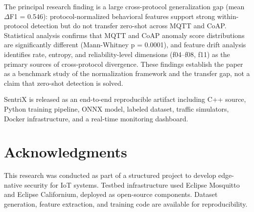 \documentclass[conference]{IEEEtran}
\begin{document}
The principal research finding is a large cross-protocol generalization gap (mean $\Delta$F1 = 0.546): protocol-normalized behavioral features support strong within-protocol detection but do not transfer zero-shot across MQTT and CoAP. Statistical analysis confirms that MQTT and CoAP anomaly score distributions are significantly different (Mann-Whitney p = 0.0001), and feature drift analysis identifies rate, entropy, and reliability-level dimensions (f04--f08, f11) as the primary sources of cross-protocol divergence. These findings establish the paper as a benchmark study of the normalization framework and the transfer gap, not a claim that zero-shot detection is solved.

SentriX is released as an end-to-end reproducible artifact including C++ source, Python training pipeline, ONNX model, labeled dataset, traffic simulators, Docker infrastructure, and a real-time monitoring dashboard.

\section*{Acknowledgments}
This research was conducted as part of a structured project to develop edge-native security for IoT systems. Testbed infrastructure used Eclipse Mosquitto and Eclipse Californium, deployed as open-source components. Dataset generation, feature extraction, and training code are available for reproducibility.
\end{document}
